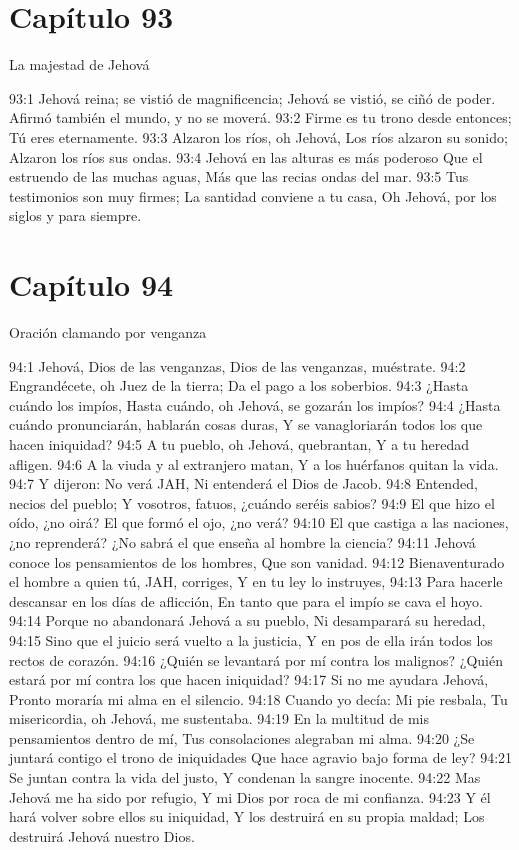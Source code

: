 \section*{Capítulo 93}
La majestad de Jehová 
 
93:1 Jehová reina; se vistió de magnificencia; 
Jehová se vistió, se ciñó de poder. 
Afirmó también el mundo, y no se moverá. 
93:2 Firme es tu trono desde entonces; 
Tú eres eternamente. 
93:3 Alzaron los ríos, oh Jehová, 
Los ríos alzaron su sonido; 
Alzaron los ríos sus ondas. 
93:4 Jehová en las alturas es más poderoso 
Que el estruendo de las muchas aguas, 
Más que las recias ondas del mar. 
93:5 Tus testimonios son muy firmes; 
La santidad conviene a tu casa, 
Oh Jehová, por los siglos y para siempre. 
\section*{Capítulo 94}
Oración clamando por venganza 
 
94:1 Jehová, Dios de las venganzas, 
Dios de las venganzas, muéstrate. 
94:2 Engrandécete, oh Juez de la tierra; 
Da el pago a los soberbios. 
94:3 ¿Hasta cuándo los impíos, 
Hasta cuándo, oh Jehová, se gozarán los impíos? 
94:4 ¿Hasta cuándo pronunciarán, hablarán cosas duras, 
Y se vanagloriarán todos los que hacen iniquidad? 
94:5 A tu pueblo, oh Jehová, quebrantan, 
Y a tu heredad afligen. 
94:6 A la viuda y al extranjero matan, 
Y a los huérfanos quitan la vida. 
94:7 Y dijeron: No verá JAH, 
Ni entenderá el Dios de Jacob. 
94:8 Entended, necios del pueblo; 
Y vosotros, fatuos, ¿cuándo seréis sabios? 
94:9 El que hizo el oído, ¿no oirá? 
El que formó el ojo, ¿no verá? 
94:10 El que castiga a las naciones, ¿no reprenderá? 
¿No sabrá el que enseña al hombre la ciencia? 
94:11 Jehová conoce los pensamientos de los hombres, 
Que son vanidad. 
94:12 Bienaventurado el hombre a quien tú, JAH, corriges, 
Y en tu ley lo instruyes, 
94:13 Para hacerle descansar en los días de aflicción, 
En tanto que para el impío se cava el hoyo. 
94:14 Porque no abandonará Jehová a su pueblo, 
Ni desamparará su heredad, 
94:15 Sino que el juicio será vuelto a la justicia, 
Y en pos de ella irán todos los rectos de corazón. 
94:16 ¿Quién se levantará por mí contra los malignos? 
¿Quién estará por mí contra los que hacen iniquidad? 
94:17 Si no me ayudara Jehová, 
Pronto moraría mi alma en el silencio. 
94:18 Cuando yo decía: Mi pie resbala, 
Tu misericordia, oh Jehová, me sustentaba. 
94:19 En la multitud de mis pensamientos dentro de mí, 
Tus consolaciones alegraban mi alma. 
94:20 ¿Se juntará contigo el trono de iniquidades 
Que hace agravio bajo forma de ley? 
94:21 Se juntan contra la vida del justo, 
Y condenan la sangre inocente. 
94:22 Mas Jehová me ha sido por refugio, 
Y mi Dios por roca de mi confianza. 
94:23 Y él hará volver sobre ellos su iniquidad, 
Y los destruirá en su propia maldad; 
Los destruirá Jehová nuestro Dios. 
